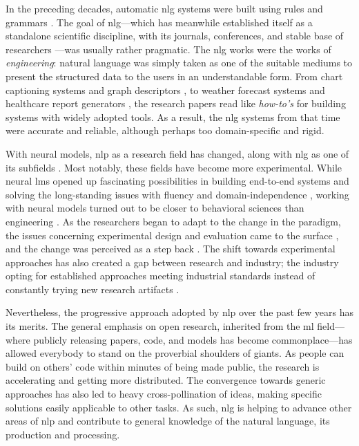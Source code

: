 In the preceding decades, automatic \ac{nlg} systems were built using rules and grammars \cite{reiterBuildingAppliedNatural1997,gattSurveyStateArt2018}. The goal of \ac{nlg}---which has meanwhile established itself as a standalone scientific discipline, with its journals, conferences, and stable base of researchers \cite{ACLanthologySIGGEN}---was usually rather pragmatic.
The \ac{nlg} works were the works of \emph{engineering}: natural language was simply taken as one of the suitable mediums to present the structured data to the users in an understandable form. From chart captioning systems \cite{mittalDescribingComplexCharts1998} and graph descriptors \cite{sunDomainIndependentSentence2006}, to weather forecast systems \cite{belzAutomaticGenerationWeather2008} and healthcare report generators \cite{portetAutomaticGenerationTextual2009}, the research papers read like \emph{how-to's} for building systems with widely adopted tools. As a result, the \ac{nlg} systems from that time were accurate and reliable, although perhaps too domain-specific and rigid.


With neural models, \ac{nlp} as a research field has changed, along with \ac{nlg} as one of its subfields \cite{gururaja2023build,li2023defining}. Most notably, these fields have become more experimental. While neural \acp{lm} opened up fascinating possibilities in building end-to-end systems and solving the long-standing issues with fluency and domain-independence \cite{ferreiraNeuralDatatotextGeneration2019,dusekEvaluatingStateoftheartEndtoEnd2020,sharmaInnovationsNeuralDatatotext2022}, working with neural models turned out to be closer to behavioral sciences than engineering \cite{holtzmanGenerativeModelsComplex2023}. As the researchers began to adapt to the change in the paradigm, the issues concerning experimental design and evaluation came to the surface \cite{gehrmannRepairingCrackedFoundation2022}, and the change was perceived as a step back \cite{reiter2020academic}. The shift towards experimental approaches has also created a gap between research and industry; the industry opting for established approaches meeting industrial standards instead of constantly trying new research artifacts \cite{daleNaturalLanguageGeneration2020,daleNavigatingTextGeneration2023}.


Nevertheless, the progressive approach adopted by \ac{nlp} over the past few years has its merits. The general emphasis on open research, inherited from the \ac{ml} field---where publicly releasing papers, code, and models has become commonplace---has allowed everybody to stand on the proverbial shoulders of giants. As people can build on others' code within minutes of being made public, the research is accelerating and getting more distributed. The convergence towards generic approaches has also led to heavy cross-pollination of ideas, making specific solutions easily applicable to other tasks. As such, \ac{nlg} is helping to advance other areas of \ac{nlp} and contribute to general knowledge of the natural language, its production and processing.

